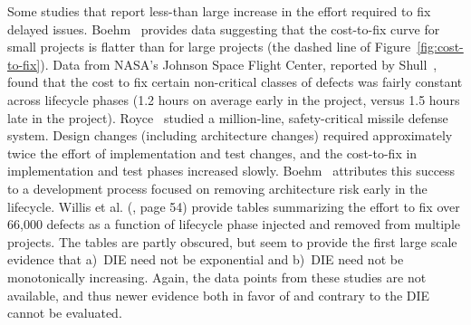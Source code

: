 \documentclass[smallcondensed]{svjour3}
\begin{document}

 
 
 




 
Some studies that report less-than large
 increase in the effort required to fix delayed issues.  Boehm~\cite{Boehm80} provides data suggesting that the cost-to-fix curve for small projects
 is flatter than for large projects (the dashed line of Figure~\ref{fig:cost-to-fix}). Data from NASA's Johnson Space Flight Center, reported by Shull~\cite{Shull02}, found that the cost to fix certain non-critical classes of defects was fairly constant across lifecycle phases (1.2 hours on average early in the project, versus 1.5 hours late in the project). Royce~\cite{Royce98} studied  a million-line, safety-critical missile defense system. Design changes (including architecture changes) required approximately twice the effort of implementation and test changes, and the cost-to-fix in implementation and test phases increased slowly. Boehm~\cite{Boehm10} attributes this success to a development process focused on removing architecture risk early in the lifecycle. Willis et al. (\cite{willis1998hughes}, page 54) provide tables summarizing the effort to fix over 66,000 defects as a function of lifecycle phase injected and removed from multiple projects. The tables are partly obscured, but seem to provide the first large scale evidence that a)~DIE need not be exponential and b)~DIE need not be monotonically increasing.  Again, the data points from these studies are not available, and thus newer evidence both in favor of and contrary to the DIE cannot be evaluated.
\end{document}
